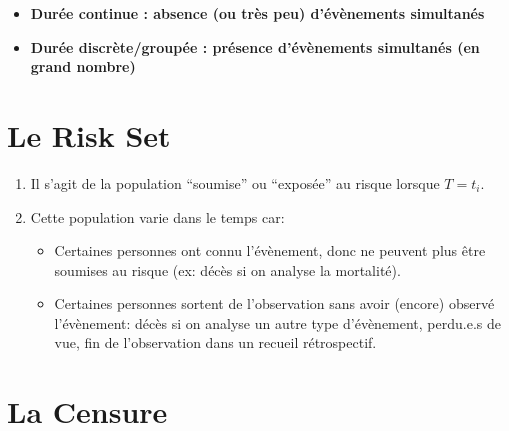 \documentclass[
  12pt,
  letterpaper,
  DIV=11,
  numbers=noendperiod,
  onepage,
  openany]{scrreprt}
\providecommand{\tightlist}{%
  \setlength{\itemsep}{0pt}\setlength{\parskip}{0pt}}\usepackage{longtable,booktabs,array}
\begin{document}
\begin{tcolorbox}[enhanced jigsaw, arc=.35mm, bottomrule=.15mm, titlerule=0mm, colbacktitle=quarto-callout-important-color!10!white, left=2mm, opacitybacktitle=0.6, toprule=.15mm, title=\textcolor{quarto-callout-important-color}{\faExclamation}\hspace{0.5em}{Important}, colframe=quarto-callout-important-color-frame, breakable, coltitle=black, opacityback=0, toptitle=1mm, bottomtitle=1mm, rightrule=.15mm, leftrule=.75mm, colback=white]

\begin{itemize}
\tightlist
\item
  \textbf{Durée continue : absence (ou très peu) d'évènements
  simultanés}\\
\item
  \textbf{Durée discrète/groupée : présence d'évènements simultanés (en
  grand nombre)}\\
\end{itemize}

\end{tcolorbox}

\hypertarget{le-risk-set}{%
\section{\texorpdfstring{\textbf{Le Risk
Set}}{Le Risk Set}}\label{le-risk-set}}

\begin{enumerate}
\def\labelenumi{\arabic{enumi}.}
\tightlist
\item
  Il s'agit de la population ``soumise'' ou ``exposée'' au risque
  lorsque \(T=t_i\).
\item
  Cette population varie dans le temps car:

  \begin{itemize}
  \tightlist
  \item
    Certaines personnes ont connu l'évènement, donc ne peuvent plus être
    soumises au risque (ex: décès si on analyse la mortalité).
  \item
    Certaines personnes sortent de l'observation sans avoir (encore)
    observé l'évènement: décès si on analyse un autre type d'évènement,
    perdu.e.s de vue, fin de l'observation dans un recueil rétrospectif.
  \end{itemize}
\end{enumerate}

\hypertarget{la-censure}{%
\section{\texorpdfstring{\textbf{La
Censure}}{La Censure}}\label{la-censure}}
\end{document}
